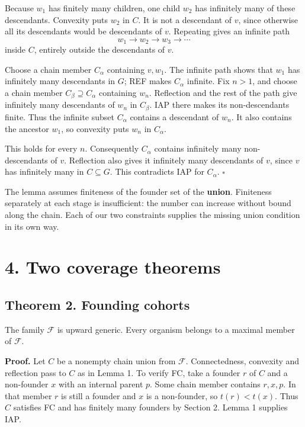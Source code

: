 \documentclass[
  11pt,
  letterpaper,
]{article}
\begin{document}
Because \(w_1\) has finitely many children, one child \(w_2\) has
infinitely many of these descendants. Convexity puts \(w_2\) in \(C\).
It is not a descendant of \(v\), since otherwise all its descendants
would be descendants of \(v\). Repeating gives an infinite path \[
                 w_1\longrightarrow w_2\longrightarrow w_3
                     \longrightarrow\cdots
\] inside \(C\), entirely outside the descendants of \(v\).

Choose a chain member \(C_\alpha\) containing \(v,w_1\). The infinite
path shows that \(w_1\) has infinitely many descendants in \(G\); REF
makes \(C_\alpha\) infinite. Fix \(n>1\), and choose a chain member
\(C_\beta\supseteq C_\alpha\) containing \(w_n\). Reflection and the
rest of the path give infinitely many descendants of \(w_n\) in
\(C_\beta\). IAP there makes its non-descendants finite. Thus the
infinite subset \(C_\alpha\) contains a descendant of \(w_n\). It also
contains the ancestor \(w_1\), so convexity puts \(w_n\) in
\(C_\alpha\).

This holds for every \(n\). Consequently \(C_\alpha\) contains
infinitely many non-descendants of \(v\). Reflection also gives it
infinitely many descendants of \(v\), since \(v\) has infinitely many in
\(C\subseteq G\). This contradicts IAP for \(C_\alpha\).
\hfill\(\square\)

The lemma assumes finiteness of the founder set of the \textbf{union}.
Finiteness separately at each stage is insufficient: the number can
increase without bound along the chain. Each of our two constraints
supplies the missing union condition in its own way.

\section{4. Two coverage theorems}\label{two-coverage-theorems}

\subsection{Theorem 2. Founding
cohorts}\label{theorem-2.-founding-cohorts}

The family \(\mathcal F\) is upward generic. Every organism belongs to a
maximal member of \(\mathcal F\).

\textbf{Proof.} Let \(C\) be a nonempty chain union from \(\mathcal F\).
Connectedness, convexity and reflection pass to \(C\) as in Lemma 1. To
verify FC, take a founder \(r\) of \(C\) and a non-founder \(x\) with an
internal parent \(p\). Some chain member contains \(r,x,p\). In that
member \(r\) is still a founder and \(x\) is a non-founder, so
\(t(r)<t(x)\). Thus \(C\) satisfies FC and has finitely many founders by
Section 2. Lemma 1 supplies IAP.
\end{document}
